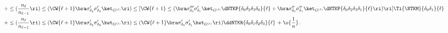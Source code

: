 \begin{align}
&+\le(\frac{n_{\ell}}{n_{\ell-1}}\ri)\le(\CW{\ell+1}\bra\sigma^{\prime}_{\delta_2}\sigma^{\prime}_{\delta_3}\ket_{G^{(\ell)}}\ri)\le[\CW{\ell+1}\le(\bra\sigma^{\prime\prime\prime}_{\delta_0}\sigma^{\prime}_{\delta_1}\ket_{G^{(\ell)}}\dNTKP{\delta_0\delta_2\delta_3\delta_0}{\ell}+\bra\sigma^{\prime\prime}_{\delta_0}\sigma^{\prime\prime}_{\delta_1}\ket_{G^{(\ell)}}\dNTKP{\delta_0\delta_2\delta_3\delta_1}{\ell}\ri)\ri]\Ti{\NTKM}{\delta_0\delta_1}{\ell}\, \notag\\
&+\le(\frac{n_{\ell}}{n_{\ell-1}}\ri)\le(\CW{\ell+1}\bra\sigma^{\prime}_{\delta_2}\sigma^{\prime}_{\delta_3}\ket_{G^{(\ell)}}\ri)\le(\CW{\ell+1}\bra\sigma^{\prime}_{\delta_0}\sigma^{\prime}_{\delta_1}\ket_{G^{(\ell)}}\ri)\ddNTKR{\delta_0\delta_1\delta_2\delta_3}{\ell}\, +\o{\frac{1}{n}}\, .\notag
\end{align}

